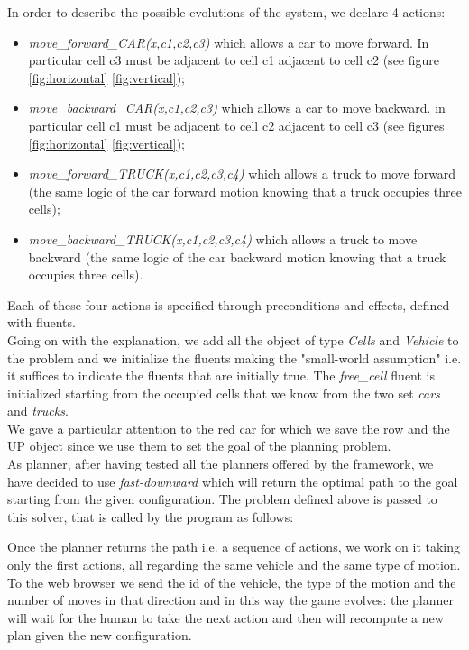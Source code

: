 \documentclass{article}
\begin{document}
\indent In order to describe the possible evolutions of the system, we declare 4 actions: 
\begin{itemize}
    \item  \textit{move\_forward\_CAR(x,c1,c2,c3)} which allows a car to move forward. In particular cell c3 must be adjacent to cell c1 adjacent to cell c2 (see figure \ref{fig:horizontal} \ref{fig:vertical});
    \item  \textit{move\_backward\_CAR(x,c1,c2,c3)} which allows a car to move backward. in particular cell c1 must be adjacent to cell c2 adjacent to cell c3 (see figures \ref{fig:horizontal} \ref{fig:vertical});
    \item  \textit{move\_forward\_TRUCK(x,c1,c2,c3,c4)} which allows a truck to move forward (the same logic of the car forward motion knowing that a truck occupies three cells);
    \item  \textit{move\_backward\_TRUCK(x,c1,c2,c3,c4)} which allows a truck to move backward (the same logic of the car backward motion knowing that a truck occupies three cells).
\end{itemize}
Each of these four actions is specified through preconditions and effects, defined with fluents.\\
\indent Going on with the explanation, we add all the object of type \textit{Cells} and \textit{Vehicle} to the problem and we initialize the fluents making the "small-world assumption" i.e. it suffices to indicate the fluents that are initially true. The \textit{free\_cell} fluent is initialized starting from the occupied cells that we know from the two set \textit{cars} and \textit{trucks}.\\
\indent We gave a particular attention to the red car for which we save the row and the UP object since we use them to set the goal of the planning problem.\\
\indent As planner, after having tested all the planners offered by the framework, we have decided to use \textit{fast-downward} which will return the optimal path to the goal starting from the given configuration. The problem defined above is passed to this solver, that is called by the program as follows:

\indent Once the planner returns the path i.e. a sequence of actions, we work on it taking only the first actions, all regarding the same vehicle and the same type of motion. To the web browser we send the id of the vehicle, the type of the motion and the number of moves in that direction and in this way the game evolves: the planner will wait for the human to take the next action and then will recompute a new plan given the new configuration.
 
\end{document}
